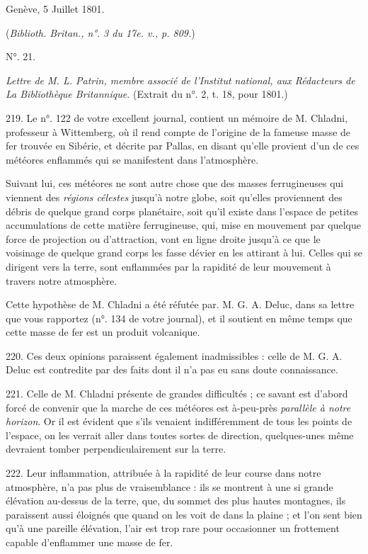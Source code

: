 \documentclass[a4paper, 11pt, oneside, polutonikogreek, french]{article}
\begin{document}
Genève, 5 Juillet 1801.

(\emph{Biblioth. Britan., n°. 3 du 17e. v., p. 809.})
 
\begin{center}
N°. 21.
\end{center}

\emph{Lettre de M. L. Patrin, membre associé de l'Institut national, aux Rédacteurs de La Bibliothèque Britannique.} (Extrait du n°. 2, t. 18, pour 1801.)

219. \og Le n°. 122 de votre excellent journal, contient un mémoire de M. Chladni, professeur à Wittemberg, où il rend compte de l'origine de la fameuse masse de fer trouvée en Sibérie, et décrite par Pallas, en disant qu'elle provient d'un de ces météores enflammés qui se manifestent dans l'atmosphère. \fg

Suivant lui, ces météores ne sont autre chose que des masses ferrugineuses qui viennent des \emph{régions célestes} jusqu'à notre globe, soit qu'elles proviennent des débris de quelque grand corps planétaire, soit qu'il existe dans l'espace de petites accumulations de cette matière ferrugineuse, qui, mise en mouvement par quelque force de projection ou d'attraction, vont en ligne droite jusqu'à ce que le voisinage de quelque grand corps les fasse dévier en les attirant à lui. Celles qui se dirigent vers la terre, sont enflammées par la rapidité de leur mouvement à travers notre atmosphère.

Cette hypothèse de M. Chladni a été réfutée par. M. G. A. Deluc, dans sa lettre que vous rapportez (n°. 134 de votre journal), et il soutient en même temps que cette masse de fer est un produit volcanique.

220. Ces deux opinions paraissent également inadmissibles : celle de M. G. A. Deluc est contredite par des faits dont il n'a pas eu sans doute connaissance.

221. Celle de M. Chladni présente de grandes difficultés ; ce savant est d'abord forcé de convenir que la marche de ces météores est à-peu-près \emph{parallèle à notre horizon}. Or il est évident que s'ils venaient indifféremment de tous les points de l'espace, on les verrait aller dans toutes sortes de direction, quelques-unes même devraient tomber perpendiculairement sur la terre.

222. Leur inflammation, attribuée à la rapidité de leur course dans notre atmosphère, n'a pas plus de vraisemblance : ils se montrent à une si grande élévation au-dessus de la terre, que, du sommet des plus hautes montagnes, ils paraissent aussi éloignés que quand on les voit de dans la plaine ; et l'on sent bien qu'à une pareille élévation, l'air est trop rare pour occasionner un frottement capable d'enflammer une masse de fer.
\end{document}
